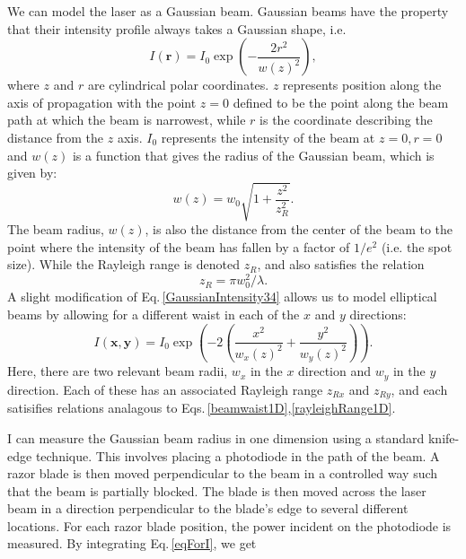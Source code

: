 We can model the laser as a Gaussian beam. Gaussian beams have the property that their intensity profile always takes a Gaussian shape, i.e. \cite{lasersMilonniEberly}
\begin{equation}
\label{GaussianIntensity34}
    I(\mathbf{r})=I_0\exp\left(-\frac{2r^2}{w(z)^2}\right),
\end{equation}
where $z$ and $r$ are cylindrical polar coordinates. $z$ represents position along the axis of propagation with the point $z=0$ defined to be the point along the beam path at which the beam is narrowest, while $r$ is the coordinate describing the distance from the $z$ axis. $I_0$ represents the intensity of the beam at $z=0, r=0$ and $w(z)$ is a function that gives the radius of the Gaussian beam, which is given by:
\begin{equation}
w(z)=w_0\sqrt{1+\frac{z^2}{z_R^2}}\label{beamwaist1D}.
\end{equation}
The beam radius, $w(z)$, is also the distance from the center of the beam to the point where the intensity of the beam has fallen by a factor of $1/e^2$ (i.e. the spot size). While the Rayleigh range is denoted $z_R$, and also satisfies the relation 
\begin{equation}
z_R=\pi w_0^2/\lambda \label{rayleighRange1D}.
\end{equation}
A slight modification of Eq.\,\eqref{GaussianIntensity34} allows us to model elliptical beams by allowing for a different waist in each of the $x$ and $y$ directions:
\begin{equation}\label{eqForI}
    I(\mathbf{x,y})=I_0\exp\left(-2\left(\frac{x^2}{w_x(z)^2}+\frac{y^2}{w_y(z)^2}\right)\right).
\end{equation}
Here, there are two relevant beam radii, $w_x$ in the $x$ direction and $w_y$ in the $y$ direction. Each of these has an associated Rayleigh range $z_{Rx}$ and $z_{Ry}$, and each satisifies relations analagous to Eqs.\,\eqref{beamwaist1D},\eqref{rayleighRange1D}.

I can measure the Gaussian beam radius in one dimension using a standard knife-edge technique. This involves placing a photodiode in the path of the beam. A razor blade is then moved perpendicular to the beam in a controlled way such that the beam is partially blocked. The blade is then moved across the laser beam in a direction perpendicular to the blade's edge to several different locations. For each razor blade position, the power incident on the photodiode is measured. By integrating Eq.\,\ref{eqForI}, we get

